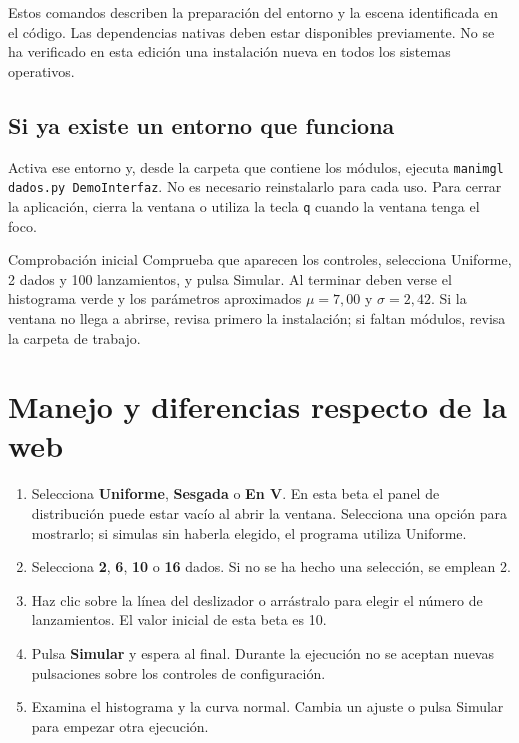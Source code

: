 \documentclass[11pt,a4paper]{article}
\begin{document}
Estos comandos describen la preparación del entorno y la escena identificada en el código. Las dependencias nativas deben estar disponibles previamente. No se ha verificado en esta edición una instalación nueva en todos los sistemas operativos.

\subsection{Si ya existe un entorno que funciona}
Activa ese entorno y, desde la carpeta que contiene los módulos, ejecuta \texttt{manimgl dados.py DemoInterfaz}. No es necesario reinstalarlo para cada uso. Para cerrar la aplicación, cierra la ventana o utiliza la tecla \texttt{q} cuando la ventana tenga el foco.

\begin{nota}{Comprobación inicial}
Comprueba que aparecen los controles, selecciona Uniforme, 2 dados y 100 lanzamientos, y pulsa Simular. Al terminar deben verse el histograma verde y los parámetros aproximados $\mu=7{,}00$ y $\sigma=2{,}42$. Si la ventana no llega a abrirse, revisa primero la instalación; si faltan módulos, revisa la carpeta de trabajo.
\end{nota}

\clearpage\section{Manejo y diferencias respecto de la web}
\begin{enumerate}
\item Selecciona \textbf{Uniforme}, \textbf{Sesgada} o \textbf{En V}. En esta beta el panel de distribución puede estar vacío al abrir la ventana. Selecciona una opción para mostrarlo; si simulas sin haberla elegido, el programa utiliza Uniforme.
\item Selecciona \textbf{2}, \textbf{6}, \textbf{10} o \textbf{16} dados. Si no se ha hecho una selección, se emplean 2.
\item Haz clic sobre la línea del deslizador o arrástralo para elegir el número de lanzamientos. El valor inicial de esta beta es 10.
\item Pulsa \textbf{Simular} y espera al final. Durante la ejecución no se aceptan nuevas pulsaciones sobre los controles de configuración.
\item Examina el histograma y la curva normal. Cambia un ajuste o pulsa Simular para empezar otra ejecución.
\end{enumerate}
\end{document}

